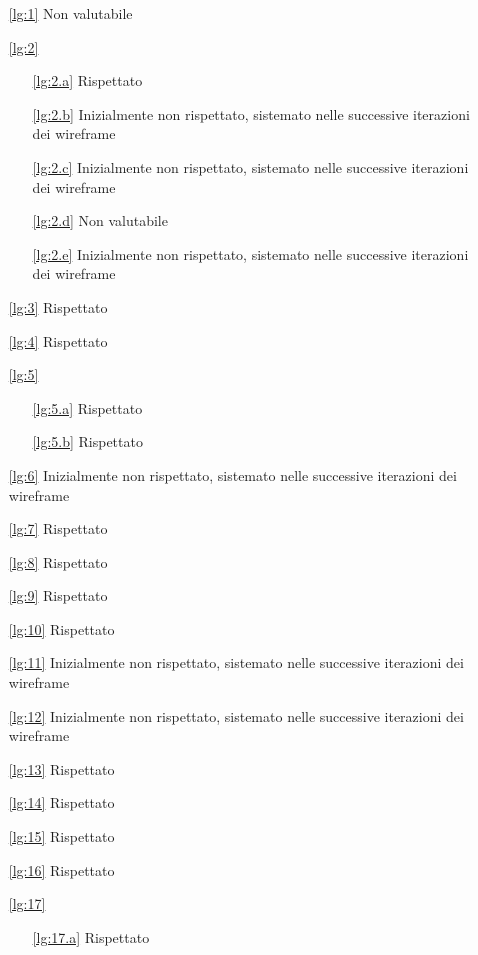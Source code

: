 \begin{itemize}
    \item[\ref{lg:1}] Non valutabile
    \item[\ref{lg:2}] \begin{itemize}
        \item[\ref{lg:2.a}] Rispettato
        \item[\ref{lg:2.b}] Inizialmente non rispettato, sistemato nelle successive iterazioni dei wireframe
        \item[\ref{lg:2.c}] Inizialmente non rispettato, sistemato nelle successive iterazioni dei wireframe
        \item[\ref{lg:2.d}] Non valutabile
        \item[\ref{lg:2.e}] Inizialmente non rispettato, sistemato nelle successive iterazioni dei wireframe
    \end{itemize}
    \item[\ref{lg:3}] Rispettato
    \item[\ref{lg:4}] Rispettato
    \item[\ref{lg:5}] \begin{itemize}
        \item[\ref{lg:5.a}] Rispettato
        \item[\ref{lg:5.b}] Rispettato
    \end{itemize}
    \item[\ref{lg:6}] Inizialmente non rispettato, sistemato nelle successive iterazioni dei wireframe
    \item[\ref{lg:7}] Rispettato
    \item[\ref{lg:8}] Rispettato
    \item[\ref{lg:9}] Rispettato
    \item[\ref{lg:10}] Rispettato
    \item[\ref{lg:11}] Inizialmente non rispettato, sistemato nelle successive iterazioni dei wireframe
    \item[\ref{lg:12}] Inizialmente non rispettato, sistemato nelle successive iterazioni dei wireframe
    \item[\ref{lg:13}] Rispettato
    \item[\ref{lg:14}] Rispettato
    \item[\ref{lg:15}] Rispettato
    \item[\ref{lg:16}] Rispettato
    \item[\ref{lg:17}] \begin{itemize}
        \item[\ref{lg:17.a}] Rispettato

\end{itemize}
\end{itemize}
